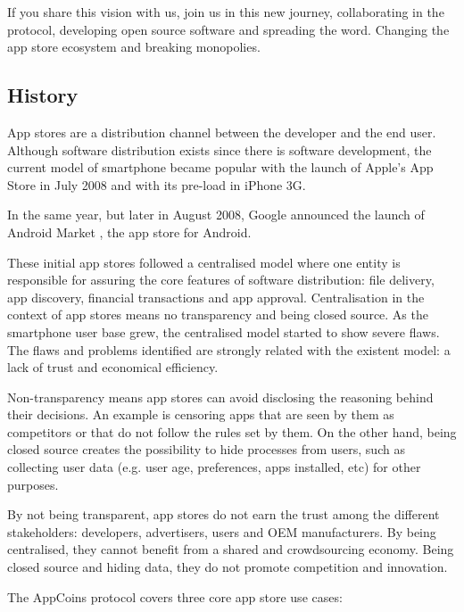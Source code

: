 If you share this vision with us, join us in this new journey, collaborating in the protocol, developing open source software and spreading the word. Changing the app store ecosystem and breaking monopolies.


\medskip

\subsection{History}

App stores are a distribution channel between the developer and the end user. Although software distribution exists since there is software development, the current model of smartphone became popular with the launch of Apple's App Store in July 2008 and with its pre-load in iPhone 3G.

In the same year, but later in August 2008, Google announced the launch of Android Market \cite{wiki:market}, the app store for Android.

These initial app stores followed a centralised model where one entity is responsible for assuring the core features of software distribution: file delivery, app discovery, financial transactions and app approval. Centralisation in the context of app stores means no transparency and being closed source. As the smartphone user base grew, the centralised model started to show severe flaws. The flaws and problems identified are strongly related with the existent model: a lack of trust and economical efficiency.

Non-transparency means app stores can avoid disclosing the reasoning behind their decisions. An example is censoring apps that are seen by them as competitors or that do not follow the rules set by them. On the other hand, being closed source creates the possibility to hide processes from users, such as collecting user data (e.g. user age, preferences, apps installed, etc) for other purposes.

By not being transparent, app stores do not earn the trust among the different stakeholders: developers, advertisers, users and OEM manufacturers. By being centralised, they cannot benefit from a shared and crowdsourcing economy. Being closed source and hiding data, they do not promote competition and innovation.

The AppCoins protocol covers three core app store use cases:

